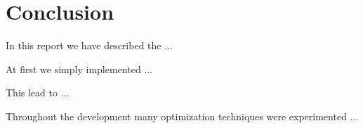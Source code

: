 \section{Conclusion}
\label{sec:Conclusion}
 In this report we have described the ...

At first we simply implemented ...

This lead to ...

Throughout the development many optimization techniques were experimented ...